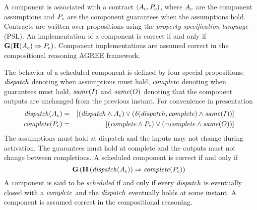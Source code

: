 
%


A component is associated with a contract $(A_c, P_c)$, where $A_c$ are the component assumptions and $P_c$ are the component guarantees when the assumptions hold.
Contracts are written over propositions using the \emph{property specification language} (PSL).
An implementation of a component is correct if and only if $\mathbf{G}(\mathbf{H}(A_c) \Rightarrow P_c)$.
Component implementations are assumed correct in the compositional reasoning AGREE framework.

The behavior of a scheduled component is defined by four special propositions: $\mathit{dispatch}$ denoting when assumptions must hold, $\mathit{complete}$ denoting when guarantees must hold, $\mathit{same}(I)$ and $\mathit{same}(O)$ denoting that the component outputs are unchanged from the previous instant. For convenience in presentation
\begin{eqnarray*}
  \mathit{dispatch}(A_c) &=& \left[\left(\mathit{dispatch} \wedge A_c\right) \vee \left(\delta(\mathit{dispatch}, \mathit{complete}) \wedge \mathit{same}(I)\right)\right] \\
  \mathit{complete}(P_c) &=& \left[\left(\mathit{complete} \wedge P_c\right) \vee \left(\neg\mathit{complete} \wedge \mathit{same}(O)\right)\right]
\end{eqnarray*}
The assumptions must hold at dispatch and the inputs may not change during activation.
The guarantees must hold at complete and the outputs must not change between completions.
A scheduled component is correct if and only if
\[
  \mathbf{G}\left(
    \mathbf{H}\left(\mathit{dispatch}(A_c)\right) \Rightarrow \mathit{complete}(P_c) \right)
\]
A component is said to be \emph{scheduled} if and only if every $\mathit{dispatch}$ is eventually closed with a $\mathit{complete}$ and the $\mathit{dispatch}$ eventually holds at some instant.
A component is assumed correct in the compositional reasoning.

